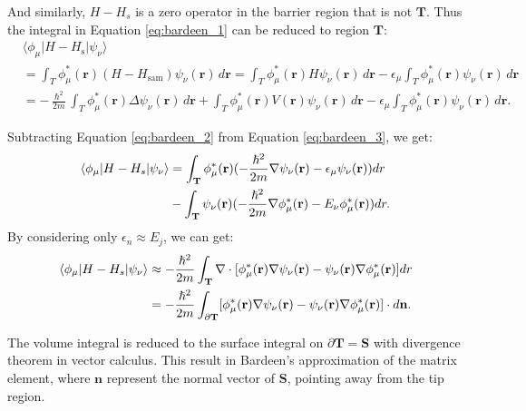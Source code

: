 And similarly, $H - H_s$ is a zero operator in the barrier region that is not $\mathbf{T}$. Thus the integral in Equation \ref{eq:bardeen_1} can be reduced to region $\mathbf{T}$:   
\begin{equation}
	\label{eq:bardeen_3}
	\begin{aligned}
		&\langle \phi_{\mu} | H - H_{\text{s}} | \psi_{\nu} \rangle \\
		&= \int_{T} \phi_{\mu}^*(\mathbf{r}) \left( H - H_{\text{sam}} \right) \psi_{\nu}(\mathbf{r}) \, d\mathbf{r} 
		= \int_{T} \phi_{\mu}^*(\mathbf{r}) H \psi_{\nu}(\mathbf{r}) \, d\mathbf{r} 
		- \epsilon_{\mu} \int_{T} \phi_{\mu}^*(\mathbf{r}) \psi_{\nu}(\mathbf{r}) \, d\mathbf{r} \\
		&= -\frac{\hslash^2}{2m} \int_{T} \phi_{\mu}^*(\mathbf{r}) \Delta \psi_{\nu}(\mathbf{r}) \, d\mathbf{r} 
		+ \int_{T} \phi_{\mu}^*(\mathbf{r}) V(\mathbf{r}) \psi_{\nu}(\mathbf{r}) \, d\mathbf{r} 
		- \epsilon_{\mu} \int_{T} \phi_{\mu}^*(\mathbf{r}) \psi_{\nu}(\mathbf{r}) \, d\mathbf{r}.
	\end{aligned}
\end{equation}

Subtracting Equation \ref{eq:bardeen_2} from Equation \ref{eq:bardeen_3}, we get: 
\begin{equation}
	\label{eq:bardeen_matrixelement}
	\begin{aligned}
		\braket{\phi_{\mu}|H-H_s|\psi_{\nu}} &= \int_\mathbf{T}\phi_{\mu}^*(\mathbf{r})(-\frac{\hslash^2}{2m} \nabla \psi_{\nu}(\mathbf{r}) - \epsilon_{\mu}\psi_{\nu}(\mathbf{r}))dr \\ 
		& - \int_\mathbf{T}\psi_{\nu}(\mathbf{r})(-\frac{\hslash^2}{2m} \nabla \phi_{\mu}^*(\mathbf{r}) - E_{\nu}\phi_{\mu}^*(\mathbf{r}))dr.
	\end{aligned}
\end{equation}
By considering only $\epsilon_n \approx E_j$, we can get:
\begin{align}
	\label{eq:bardeen4}
	\braket{\phi_{\mu}|H-H_s|\psi_{\nu}} &\approx -\frac{\hslash^2}{2m}\int_\mathbf{T}\nabla \cdot [\phi_{\mu}^*(\mathbf{r})\nabla\psi_{\nu}(\mathbf{r})-\psi_{\nu}(\mathbf{r})\nabla\phi_{\mu}^*(\mathbf{r})]dr\\ \label{eq:bardeen5}
	& = -\frac{\hslash^2}{2m}\int_{\partial\mathbf{T}}[\phi_{\mu}^*(\mathbf{r})\nabla\psi_{\nu}(\mathbf{r})-\psi_{\nu}(\mathbf{r})\nabla\phi_{\mu}^*(\mathbf{r})]\cdot d\mathbf{n}.
\end{align}

The volume integral is reduced to the surface integral on $\partial \mathbf{T} = \mathbf{S}$ with divergence theorem in vector calculus. This result in Bardeen's approximation of the matrix element, where $\mathbf{n}$ represent the normal vector of $\mathbf{S}$, pointing away from the tip region.  

